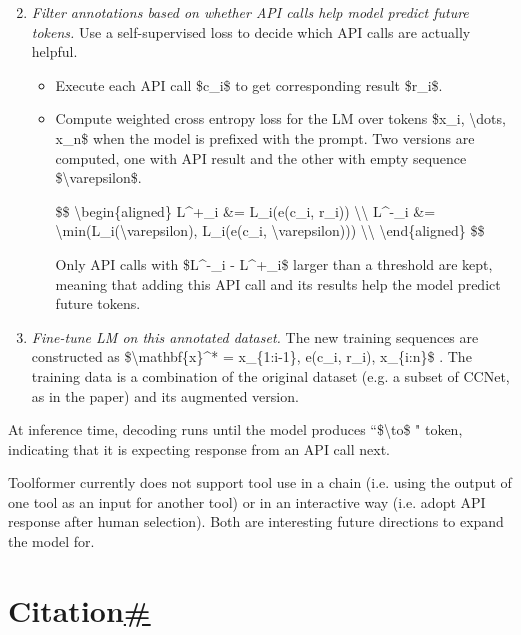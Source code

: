 \begin{enumerate}
\setcounter{enumi}{1}
\item
  \emph{Filter annotations based on whether API calls help model predict future tokens.} Use a self-supervised loss to decide which API calls are actually helpful.

  \begin{itemize}
  \item
    Execute each API call \$c\_i\$ to get corresponding result \$r\_i\$.
  \item
    Compute weighted cross entropy loss for the LM over tokens \$x\_i, \textbackslash dots, x\_n\$ when the model is prefixed with the prompt. Two versions are computed, one with API result and the other with empty sequence \$\textbackslash varepsilon\$.

    \$\$ \textbackslash begin\{aligned\} L\^{}+\_i \&= L\_i(e(c\_i, r\_i)) \textbackslash\textbackslash{} L\^{}-\_i \&= \textbackslash min(L\_i(\textbackslash varepsilon), L\_i(e(c\_i, \textbackslash varepsilon))) \textbackslash\textbackslash{} \textbackslash end\{aligned\} \$\$

    Only API calls with \$L\^{}-\_i - L\^{}+\_i\$ larger than a threshold are kept, meaning that adding this API call and its results help the model predict future tokens.
  \end{itemize}
\item
  \emph{Fine-tune LM on this annotated dataset.} The new training sequences are constructed as \$\textbackslash mathbf\{x\}\^{}* = x\_\{1:i-1\}, e(c\_i, r\_i), x\_\{i:n\}\$ . The training data is a combination of the original dataset (e.g. a subset of CCNet, as in the paper) and its augmented version.
\end{enumerate}

At inference time, decoding runs until the model produces ``\$\textbackslash to\$ " token, indicating that it is expecting response from an API call next.

Toolformer currently does not support tool use in a chain (i.e. using the output of one tool as an input for another tool) or in an interactive way (i.e. adopt API response after human selection). Both are interesting future directions to expand the model for.

\section{\texorpdfstring{Citation\hyperref[citation]{\#}}{Citation\#}}\label{citation}

